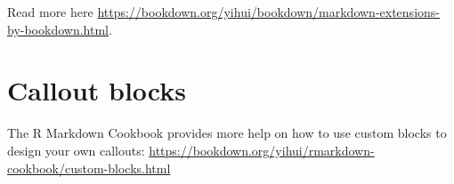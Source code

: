 \documentclass[
]{book}
\theoremstyle{definition}
\theoremstyle{definition}
\theoremstyle{definition}
\theoremstyle{definition}
\theoremstyle{remark}
\begin{document}
Read more here \url{https://bookdown.org/yihui/bookdown/markdown-extensions-by-bookdown.html}.

\hypertarget{callout-blocks}{%
\section{Callout blocks}\label{callout-blocks}}

The R Markdown Cookbook provides more help on how to use custom blocks to design your own callouts: \url{https://bookdown.org/yihui/rmarkdown-cookbook/custom-blocks.html}

  
\end{document}
